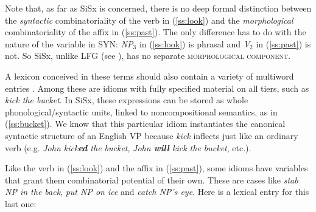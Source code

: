 \documentclass[output=paper,hidelinks]{langscibook}
\begin{document}


Note that, as far as SiSx is concerned, there is no deep formal distinction between the \textit{syntactic} combinatoriality of the verb in (\ref{ss:look}) and the \textit{morphological} combinatoriality of the affix in (\ref{ss:past}). The only difference has to do with the nature of the variable in SYN: \textit{NP}$_{3}$ in (\ref{ss:look}) is phrasal and \textit{V}$_{2}$ in (\ref{ss:past}) is not. So SiSx, unlike LFG (see \citealt{sadler2004projecting}), has no separate \textsc{morphological component}.

A lexicon conceived in these terms should also contain a variety of multiword entries \citep{culicover2017multiword}. Among these are idioms with fully specified material on all tiers, such as \textit{kick the bucket}. In SiSx, these expressions can be stored as whole phonological/syntactic units, linked to noncompositional semantics, as in (\ref{ss:bucket}). We know that this particular idiom instantiates the canonical syntactic structure of an English VP because \textit{kick} inflects just like an ordinary verb (e.g. \textit{John kick\textbf{ed} the bucket}, \textit{John \textbf{will} kick the bucket}, etc.).




Like the verb in (\ref{ss:look}) and the affix in (\ref{ss:past}), some idioms have variables that grant them combinatorial potential of their own. These are cases like \textit{stab NP in the back}, \textit{put NP on ice} and \textit{catch NP's eye}. Here is a lexical entry for this last one:

\end{document}
